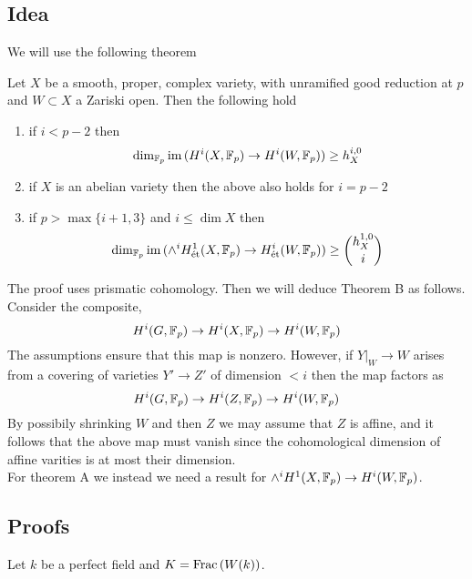 \documentclass[12pt]{article}
\begin{document}
\subsection{Idea}

We will use the following theorem

\begin{theorem}[C]
Let $X$ be a smooth, proper, complex variety, with unramified good reduction at $p$ and $W \subset X$ a Zariski open. Then the following hold
\begin{enumerate}
\item if $i < p - 2$ then
\[ \dim_{\mathbb{F}_p} \operatorname{\mathrm{im}}{(H^i(X, \mathbb{F}_p) \to H^i(W, \mathbb{F}_p))} \ge h^{i,0}_X \]
\item if $X$ is an abelian variety then the above also holds for $i = p - 2$
\item if $p > \max \{ i + 1 , 3 \}$ and $i \le \dim{X}$ then
\[ \dim_{\mathbb{F}_p} \operatorname{\mathrm{im}}{(\wedge^i H^1_{\text{\'{e}t}}(X, \mathbb{F}_p) \to H^i_{\text{\'{e}t}}(W, \mathbb{F}_p))} \ge { h^{1,0}_X \choose i } \]
\end{enumerate}
\end{theorem}

The proof uses prismatic cohomology. Then we will deduce Theorem B as follows. Consider the composite,
\[ H^i(G, \mathbb{F}_p) \to H^i(X, \mathbb{F}_p) \to H^i(W, \mathbb{F}_p) \]
The assumptions ensure that this map is nonzero. However, if $Y|_W \to W$ arises from a covering of varieties $Y' \to Z'$ of dimension $< i$ then the map factors as
\[ H^i(G, \mathbb{F}_p) \to H^i(Z, \mathbb{F}_p) \to H^i(W, \mathbb{F}_p) \]
By possibily shrinking $W$ and then $Z$ we may assume that $Z$ is affine, and it follows that the above map must vanish since the cohomological dimension of affine varities is at most their dimension.
\bigskip\\
For theorem A we instead we need a result for $\wedge^i H^1(X, \mathbb{F}_p) \to H^i(W, \mathbb{F}_p)$. 

\subsection{Proofs}

Let $k$ be a perfect field and $K = \mathrm{Frac}\left(W(k)\right)$. 
\end{document}
